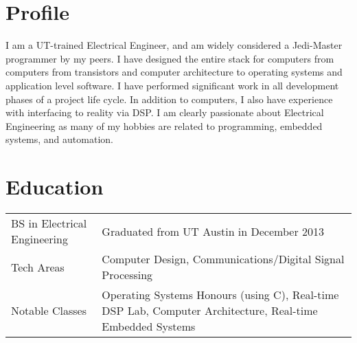 \documentclass[letterpaper,12pt]{resume}
\begin{document}
\let\olditemize\itemize
\renewcommand{\itemize}{
  \olditemize
  \setlength{\itemsep}{1pt}
  \setlength{\parskip}{0pt}
  \setlength{\parsep}{0pt}
}

\author{James Brisson}
\maketitle

\section{Profile}
\noindent
I am a UT-trained Electrical Engineer, and am widely considered a Jedi-Master programmer by my peers.
I have designed the entire stack for computers from computers from transistors and computer architecture to operating systems and application level software. 
I have performed significant work in all development phases of a project life cycle.
In addition to computers, I also have experience with interfacing to reality via DSP.
I am clearly passionate about Electrical Engineering as many of my hobbies are related to programming, embedded systems, and automation.

\section{Education}
\noindent
\begin{tabular}{p{}p{}}
  BS in Electrical Engineering&
  Graduated from UT Austin in December 2013\\
  \noalign{\smallskip}
  Tech Areas&
  Computer Design, Communications/Digital Signal Processing\\
  \noalign{\smallskip}
  Notable Classes&
  Operating Systems Honours (using C), Real-time DSP Lab, Computer Architecture, Real-time Embedded Systems\\
\end{tabular}
\end{document}
